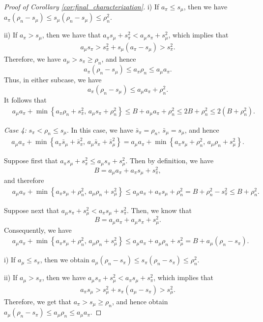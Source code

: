\documentclass[11pt]{article}
\begin{document}
\begin{proof}[Proof of Corollary \ref{cor:final_characterization}]
i) If \(a_\pi\le s_\mu\), then we have $a_\pi(\rho_n-s_\mu)
\le
s_\mu(\rho_n-s_\mu)
\le
\rho_n^2$.


ii) If \(a_\pi>s_\mu\), then we have that $a_\pi s_\mu+s_\pi^2
<
a_\mu s_\pi+s_\mu^2$, which implies that
\begin{align*}
a_\mu s_\pi
>
s_\pi^2+s_\mu(a_\pi-s_\mu)
>
s_\pi^2.
\end{align*}
Therefore, we have $a_\mu>s_\pi\ge\rho_n$, and hence
\[
a_\pi(\rho_n-s_\mu)
\le
a_\pi\rho_n
\le
a_\mu a_\pi.
\]
Thus, in either subcase, we have
\[
a_\pi(\rho_n-s_\mu)
\le
a_\mu a_\pi+\rho_n^2.
\]
It follows that
\begin{align*}
&a_\mu a_\pi+
\min\left\{
a_\pi\rho_n+s_\pi^2,\,
a_\mu s_\pi+\rho_n^2
\right\}
\le
B+a_\mu a_\pi+\rho_n^2
\le
2B+\rho_n^2\le
2(B+\rho_n^2).
\end{align*}

\medskip

\noindent
\emph{Case 4:} \(s_\pi<\rho_n\le s_\mu\). In this case, we have $\bar s_\pi=\rho_n,
\ 
\bar s_\mu=s_\mu$, and hence
\begin{align*}
a_\mu a_\pi+
\min\left\{
a_\pi\bar s_\mu+\bar s_\pi^2,\,
a_\mu\bar s_\pi+\bar s_\mu^2
\right\}
=
a_\mu a_\pi+
\min\left\{
a_\pi s_\mu+\rho_n^2,\,
a_\mu\rho_n+s_\mu^2
\right\}.
\end{align*}

Suppose first that
$a_\pi s_\mu+s_\pi^2
\le
a_\mu s_\pi+s_\mu^2$. Then by definition, we have
\[
B=a_\mu a_\pi+a_\pi s_\mu+s_\pi^2,
\]
and therefore
\begin{align*}
&a_\mu a_\pi+
\min\left\{
a_\pi s_\mu+\rho_n^2,\,
a_\mu\rho_n+s_\mu^2
\right\}\le
a_\mu a_\pi+a_\pi s_\mu+\rho_n^2
=
B+\rho_n^2-s_\pi^2
\le
B+\rho_n^2.
\end{align*}

Suppose next that $a_\mu s_\pi+s_\mu^2
<
a_\pi s_\mu+s_\pi^2$. Then, we know that
\[
B=a_\mu a_\pi+a_\mu s_\pi+s_\mu^2.
\]
Consequently, we have
\begin{align*}
&a_\mu a_\pi+
\min\left\{
a_\pi s_\mu+\rho_n^2,\,
a_\mu\rho_n+s_\mu^2
\right\}
\le
a_\mu a_\pi+a_\mu\rho_n+s_\mu^2=
B+a_\mu(\rho_n-s_\pi).
\end{align*}

i) If \(a_\mu\le s_\pi\), then we obtain $a_\mu(\rho_n-s_\pi)
\le
s_\pi(\rho_n-s_\pi)
\le
\rho_n^2$.

ii) If \(a_\mu>s_\pi\), then we have $a_\mu s_\pi+s_\mu^2
<
a_\pi s_\mu+s_\pi^2$, which implies that
\begin{align*}
a_\pi s_\mu
>
s_\mu^2+s_\pi(a_\mu-s_\pi)
>
s_\mu^2.
\end{align*}
Therefore, we get that $a_\pi>s_\mu\ge\rho_n$,
and hence obtain $a_\mu(\rho_n-s_\pi)
\le
a_\mu\rho_n
\le
a_\mu a_\pi$.


\end{proof}
\end{document}
